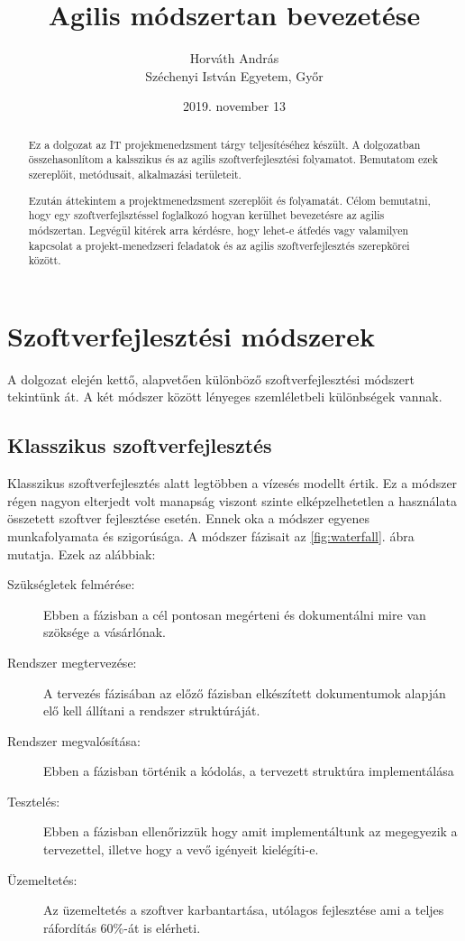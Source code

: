 \documentclass[a4paper,12pt,leqno, notitlepage]{article}%
\newcommand{\figref}[1]{\ref{fig:#1}.}
\begin{document}
\title{Agilis módszertan bevezetése}
\author{Horváth András \\ Széchenyi István Egyetem, Győr}
\date{2019. november 13}
\maketitle

\begin{abstract}

Ez a dolgozat az IT projekmenedzsment tárgy teljesítéséhez készült. A dolgozatban összehasonlítom a kalsszikus és az agilis szoftver\-fejlesztési folya\-matot. Bemutatom ezek szereplőit, metódusait, alkalmazási területeit.

Ezután áttekintem a projektmenedzsment szereplőit és folyamatát. Célom bemutatni, hogy egy szoftverfejlsztéssel foglalkozó hogyan kerülhet bevezetésre az agilis módszertan. Legvégül kitérek arra kérdésre, hogy lehet-e átfedés vagy valamilyen kapcsolat a projekt-menedzseri feladatok és az agilis szoftver\-fejlesztés szerepkörei között.
\end{abstract}

\section{Szoftver\-fejlesztési módszerek}
\label{sec:s}

A dolgozat elején kettő, alapvetően különböző szoftver\-fejlesztési módszert tekintünk át. A két módszer között lényeges szemléletbeli különbségek vannak.

\subsection{Klasszikus szoftver\-fejlesztés}
\label{sec:Klasszikus}

Klasszikus szoftver\-fejlesztés alatt legtöbben a vízesés modellt értik. Ez a módszer régen nagyon elterjedt volt manapság viszont szinte elképzelhetetlen a használata összetett szoftver fejlesztése esetén. Ennek oka a módszer egyenes munkafolyamata és szigorúsága. A módszer fázisait az \figref{waterfall} ábra~\cite{waterfall_image} mutatja. Ezek az alábbiak:
\begin{description}
	\item[Szükségletek felmérése:] Ebben a fázisban a cél pontosan megérteni és dokumentálni mire van szöksége a vásárlónak.
	\item[Rendszer megtervezése:] A tervezés fázisában az előző fázisban elkészített dokumentumok alapján elő kell állítani a rendszer struktúráját.
	\item[Rendszer megvalósítása:] Ebben a fázisban történik a kódolás, a tervezett struktúra implementálása
	\item[Tesztelés:] Ebben a fázisban ellenőrizzük hogy amit implementáltunk az megegyezik a tervezettel, illetve hogy a vevő igényeit kielégíti-e.
	\item[Üzemeltetés:] Az üzemeltetés a szoftver karbantartása, utólagos fejlesztése ami a teljes ráfordítás 60\%-át is elérheti.\cite{waterfall}
\end{description}
\end{document}
